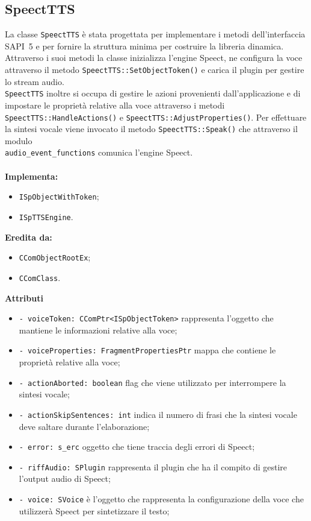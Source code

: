 \subsection{SpeectTTS}
La classe \texttt{SpeectTTS} è stata progettata per implementare i metodi dell'interfaccia SAPI~5 e per fornire la struttura minima per costruire la libreria dinamica.
Attraverso i suoi metodi la classe inizializza l'engine Speect, ne configura la voce attraverso il metodo \texttt{SpeectTTS::SetObjectToken()} e carica il plugin per gestire lo stream audio.\\
\texttt{SpeectTTS} inoltre si occupa di gestire le azioni provenienti dall'applicazione e di impostare le proprietà relative alla voce attraverso i metodi\\\texttt{SpeectTTS::HandleActions()} e \texttt{SpeectTTS::AdjustProperties()}.
Per effettuare la sintesi vocale viene invocato il metodo \texttt{SpeectTTS::Speak()} che attraverso il modulo\\\texttt{audio\_event\_functions} comunica l'engine Speect.\\\\
\textbf{Implementa:}
\begin{itemize}
	\item \texttt{ISpObjectWithToken};
	\item \texttt{ISpTTSEngine}.
\end{itemize}
\textbf{Eredita da:}
\begin{itemize}
	\item \texttt{CComObjectRootEx};
	\item \texttt{CComClass}.
\end{itemize}
\textbf{Attributi}
\begin{itemize}
	\item \texttt{- voiceToken: CComPtr<ISpObjectToken>} rappresenta l'oggetto che mantiene le informazioni relative alla voce;
	\item \texttt{- voiceProperties: FragmentPropertiesPtr} mappa che contiene le proprietà relative alla voce;
	\item \texttt{- actionAborted: boolean} flag che viene utilizzato per interrompere la sintesi vocale;
	\item \texttt{- actionSkipSentences: int} indica il numero di frasi che la sintesi vocale deve saltare durante l'elaborazione;
	\item \texttt{- error: s\_erc} oggetto che tiene traccia degli errori di Speect;
	\item \texttt{- riffAudio: SPlugin} rappresenta il plugin che ha il compito di gestire l'output audio di Speect;
	\item \texttt{- voice: SVoice} è l'oggetto che rappresenta la configurazione della voce che utilizzerà Speect per sintetizzare il testo;   
\end{itemize}
